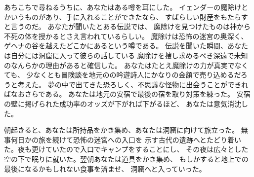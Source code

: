 あちこちで尋ねるうちに、あなたはある噂を耳にした。
イェンダーの魔除けとかいうものがあり、手に入れることができたなら、
すばらしい財産をもたらすと言うのだ。
あなたが聞いたとある伝説では、
魔除けを見つけたものは神から不死の体を授かるとさえ言われているらしい。
魔除けは恐怖の迷宮の奥深く、ゲヘナの谷を越えたどこかにあるという噂である。
伝説を聞いた瞬間、あなたは自分には洞窟に入って彼らの話している
魔除けを捜し求めるべき深遠で未知のなんらかの理由があると確信した。
あなたはたとえ魔除けの力が真実でなくても、
少なくとも冒険談を地元のの吟遊詩人にかなりの金額で売り込めるだろうと考えた。
夢の中で出てきた恐ろしく、不思議な怪物に出会うことができればなおさらである。
あなたは地元の安宿で最後の宿を取り対策を練った。
安宿の壁に掲げられた成功率のオッズが下がれば下がるほど、
あなたは意気消沈した。

\nd 朝起きると、あなたは所持品をかき集め、あなたは洞窟に向けて旅立った。
無事何日かの旅を続けて恐怖の迷宮への入口を
示す古代の遺跡へとたどり着いた。夜も更けていたので入口でキャンプをすることにし、
その夜は広々とした空の下で眠りに就いた。翌朝あなたは道具をかき集め、
もしかすると地上での最後になるかもしれない食事を済ませ、
洞窟へと入っていった。


